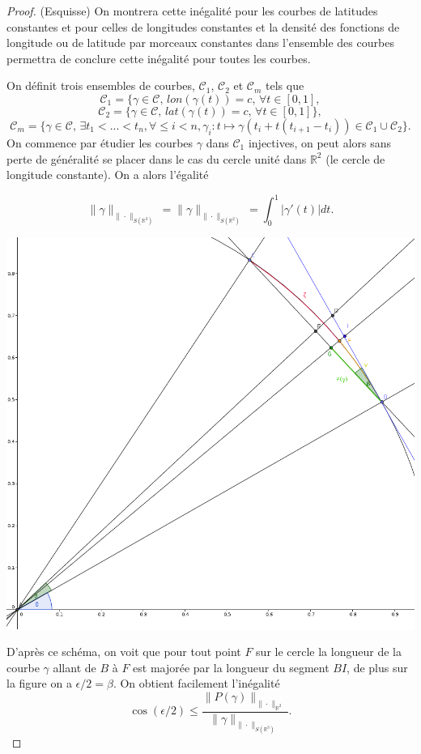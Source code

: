 \documentclass[a4paper,11pt]{article}
\begin{document}
\begin{proof} (Esquisse) On montrera cette inégalité pour les courbes de latitudes constantes et pour celles de longitudes constantes et la densité des fonctions de longitude ou de latitude par morceaux constantes dans l'ensemble des courbes permettra de conclure cette inégalité pour toutes les courbes.

\vspace{4mm}

On définit trois ensembles de courbes, $\mathcal{C}_1$, $\mathcal{C}_2$ et $\mathcal{C}_{m}$ tels que \[\mathcal{C}_1=\{\gamma \in \mathcal{C},\, lon(\gamma(t))=c, \, \forall t \in [0,1],\]
\[\mathcal{C}_2=\{\gamma \in \mathcal{C},\, lat(\gamma(t))=c, \, \forall t \in [0,1]\},\]
\[\mathcal{C}_m=\{\gamma \in \mathcal{C},\, \exists t_1<...<t_n,\forall \leq i<n, \gamma_i: t \mapsto \gamma(t_i+ t(t_{i+1}-t_i)) \in \mathcal{C}_1 \cup \mathcal{C}_2\}.\]
On commence par étudier les courbes $\gamma$ dans $\mathcal{C}_1$ injectives, on peut alors sans perte de généralité se placer dans le cas du cercle unité dans $\mathbb{R}^2$ (le cercle de longitude constante). On a alors l'égalité

\[\|\gamma\|_{\|\cdot\|_{S(\mathbb{R}^3)}}=\|\gamma\|_{\|\cdot\|_{S(\mathbb{R}^2)}}=\int_{0}^{1}|\gamma'(t)|dt.\]

\begin{center}
	\captionsetup{type=figure}
	\includegraphics[scale=0.25]{images/geogebra_lambert.png}
\end{center}
D'après ce schéma, on voit que pour tout point $F$ sur le cercle la longueur de la courbe $\gamma$ allant de $B$ à $F$  est majorée par la longueur du segment $BI$, de plus sur la figure  on a $\epsilon/2=\beta$. On obtient facilement l'inégalité
\[\cos(\epsilon/2)\leq\frac{\|P(\gamma)\|_{\|\cdot\|_{\mathbb{R}^2}}}{\|\gamma\|_{\|\cdot\|_{S(\mathbb{R}^3)}}}.\]


\end{proof}
\end{document}
